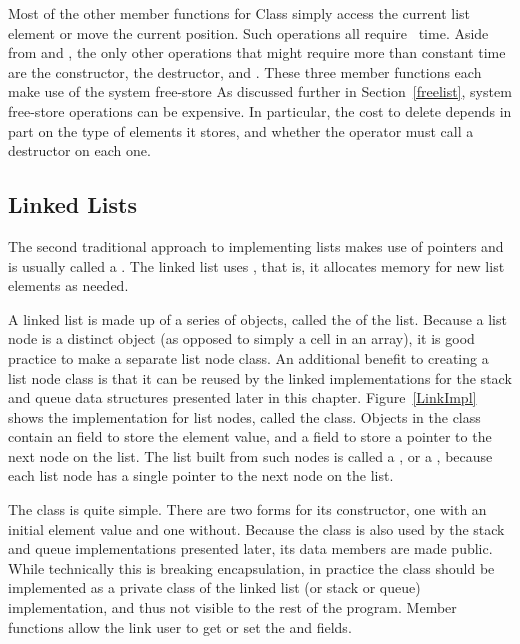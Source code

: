 Most of the other member functions for Class  simply
access the current list element or move the current position.
Such operations all require \Thetaone\ time.
Aside from  and ,
the only other operations that might require more than
constant time are the constructor, the destructor, and .
These three member functions each make use of the system
free-store
As discussed further in Section~\ref{freelist}, system free-store
operations can be expensive.
{In particular, the cost to delete  depends in part on
the type of elements it stores, and whether the  operator
must call a destructor on each one.}{}

\subsection{Linked Lists}
\label{LinkedList}

The
second traditional approach to implementing lists makes use of
pointers and is usually called a .
The linked list uses
,
that is, it allocates memory for new list elements as needed.

A linked list is made up of a series of objects, called the
 of the list.
Because a list node is a distinct object (as opposed to simply a cell
in an array), it is good practice to make a separate list node class.
An additional benefit to creating a list node class is that
it can be reused by the linked implementations for the stack and
queue data structures presented later in this chapter.
Figure~\ref{LinkImpl} shows the implementation for
list nodes, called the  class.
Objects in the  class contain an  field to
store the element value, and a  field to store a pointer to
the next node on the list.
The list built from such nodes is called a
,
or a , because each list node
has a single pointer to the next node on the list.

The  class is quite simple.
There are two forms for its constructor, one with
an initial element value and one without.
{Because the  class is also used by the
stack and queue implementations presented
later, its data members are made public.
While technically this is breaking encapsulation, in practice the
 class should be implemented as a private class of the
linked list (or stack or queue) implementation, and thus not visible
to the rest of the program.}{}
{Member functions allow the link user to get or set the 
and  fields.}{}

